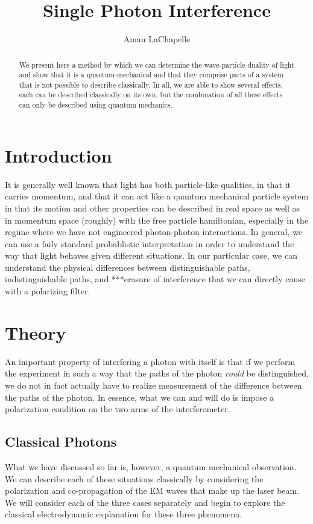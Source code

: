 \documentclass{article}
\title{Single Photon Interference}
\author{Aman LaChapelle}
\begin{document}
\raggedright
\maketitle

\begin{abstract}
	We present here a method by which we can determine the wave-particle duality of light and show that it is a quantum-mechanical and that they comprise parts of a system that is not possible to describe classically.  In all, we are able to show several effects, each can be described classically on its own, but the combination of all these effects can only be described using quantum mechanics.
\end{abstract}

\tableofcontents
\newpage

\section{Introduction}
	It is generally well known that light has both particle-like qualities, in that it carries momentum, and that it can act like a quantum mechanical particle system in that its motion and other properties can be described in real space as well as in momentum space (roughly) with the free particle hamiltonian, especially in the regime where we have not engineered photon-photon interactions.  In general, we can use a faily standard probablistic interpretation in order to understand the way that light behaves given different situations.  In our particular case, we can understand the physical differences between distinguishable paths, indistinguishable paths, and ***erasure of interference that we can directly cause with a polarizing filter.


\section{Theory}
	An important property of interfering a photon with itself is that if we perform the experiment in such a way that the paths of the photon \emph{could} be distinguished, we do not in fact actually have to realize measurement of the difference between the paths of the photon.  In essence, what we can and will do is impose a polarization condition on the two arms of the interferometer.

	\subsection{Classical Photons}
	What we have discussed so far is, however, a quantum mechanical observation.  We can describe each of these situations classically by considering the polarization and co-propagation of the EM waves that make up the laser beam.  We will consider each of the three cases separately and begin to explore the classical electrodynamic explanation for these three phenomena.
\end{document}
